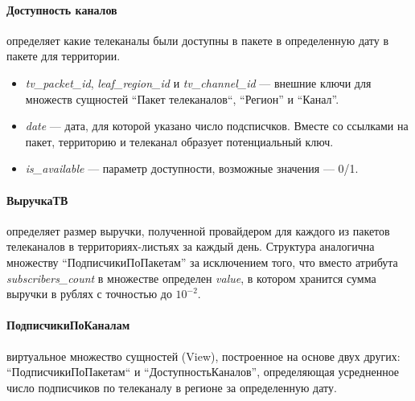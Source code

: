\paragraph{Доступность каналов} определяет какие телеканалы были доступны в пакете в определенную дату в пакете для территории.
\begin{itemize}
\item{
  \textit{tv\_packet\_id}, \textit{leaf\_region\_id} и \textit{tv\_channel\_id} --- внешние ключи для множеств сущностей 
``Пакет телеканалов``, ``Регион'' и ``Канал''.
}
\item{
  \textit{date} --- дата, для которой указано число подсписчков. Вместе со ссылками на пакет, территорию и телеканал
образует потенциальный ключ.
}
\item{
  \textit{is\_available} --- параметр доступности, возможные значения --- 0/1. 
}
\end{itemize}

\paragraph{ВыручкаТВ} определяет размер выручки, полученной провайдером для каждого из пакетов телеканалов в территориях-листьях 
за каждый день. Структура аналогична множеству ``ПодписчикиПоПакетам'' за исключением того, что вместо атрибута 
\textit{subscribers\_count} в множестве определен \textit{value}, в котором хранится сумма выручки в рублях с точностью до $10^{-2}$.

\paragraph{ПодписчикиПоКаналам} виртуальное множество сущностей (View), построенное на основе двух других:
``ПодписчикиПоПакетам`` и ``ДоступностьКаналов'', определяющая усредненное число подписчиков по телеканалу в регионе
за определенную дату.

